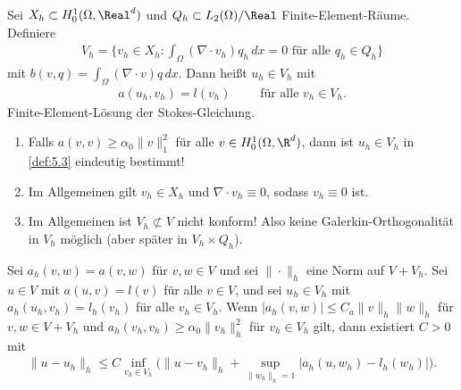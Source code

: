 \begin{Definition}
    \label{def:5.3}
    Sei $X_h \subset H^1_0(\Omega,\Real^d)$ und $Q_h\subset L_2(\Omega)/\Real$
    Finite-Element-Räume. Definiere
    \begin{eqnarray*}
        V_h = \{ v_h\in X_h: \int_\Omega (\nabla \cdot v_h) q_h \,dx = 0
        \text{ für alle } q_h\in Q_h\}
    \end{eqnarray*}
    mit $b(v, q) = \int_\Omega (\nabla \cdot v) q \,dx$. 
    Dann hei\ss{}t $u_h\in V_h$ mit
    \begin{eqnarray*}
        a(u_h, v_h) = l(v_h)\qquad
        \text{ für alle } v_h\in V_h.
    \end{eqnarray*}
    Finite-Element-Lösung der Stokes-Gleichung.
\end{Definition}


\begin{Bemerkung}
    \begin{enumerate}[1)]
      \item 
        Falls $a(v ,v) \ge \alpha_0 \|v\|_1^2$ für alle $v\in H_0^1(\Omega,
        \R^d)$, dann ist $u_h\in V_h$ in \eqref{def:5.3} eindeutig bestimmt!
      \item
        Im Allgemeinen gilt $v_h\in X_h$ und $\nabla \cdot v_h  \equiv 0$,
        sodass $v_h \equiv 0$ ist.
      \item
        Im Allgemeinen ist $V_h \not \subset V$ nicht konform! Also keine
        Galerkin-Orthogonalität in $V_h$ möglich (aber später in $V_h
        \times Q_h$).
    \end{enumerate}
\end{Bemerkung}


\begin{Lemma}
    \label{lem:5.4}
    Sei $a_h(v, w) = a(v, w)$ für $v,w\in V$ und sei $\|\cdot\|_h$ eine Norm auf
    $V+V_h$. Sei $u\in V$ mit $a(u, v) = l(v)$ für alle $v\in V$, und sei
    $u_h\in V_h$ mit $a_h(u_h, v_h) = l_h(v_h)$ für alle $v_h\in V_h$. Wenn
    $|a_h(v, w) | \le C_a \|v\|_h \|w\|_h$ für $v,w\in V+V_h$ und 
    $a_h(v_h, v_h) \ge \alpha_0 \|v_h\|_h^2$ für $v_h\in V_h$ gilt, dann
    existiert $C>0$ mit
    \begin{eqnarray*}
              \|u - u_h\|_h
          \le C \inf_{v_h\in V_h} \Big(\|u - v_h\|_h
              + \sup_{\|w_h\|_h = 1} |a_h(u, w_h)- l_h(w_h)|\Big).
    \end{eqnarray*}
\end{Lemma}


